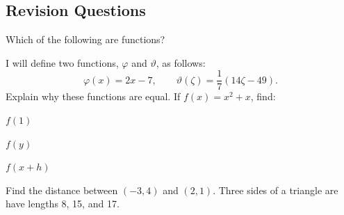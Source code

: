 \subsection*{Revision Questions}
\begin{questions}
  \question Which of the following are functions?
  \question I will define two functions, $ \varphi $ and $ \vartheta $, as follows:
            \begin{displaymath}
              \varphi(x) = 2x - 7, \qquad \vartheta(\zeta) = \frac{1}{7}(14\zeta - 49).
            \end{displaymath}
            Explain why these functions are equal.
  \question If $ f(x) = x^2 + x $, find:
    \begin{parts}
      \item $ f(1) $
      \item $ f(y) $
      \item $ f(x + h) $
    \end{parts}
  \question Find the distance between $ (-3, 4) $ and $ (2, 1) $.
  \question Three sides of a triangle are have lengths 8, 15, and 17.
    \begin{parts}

\end{parts}
\end{questions}
